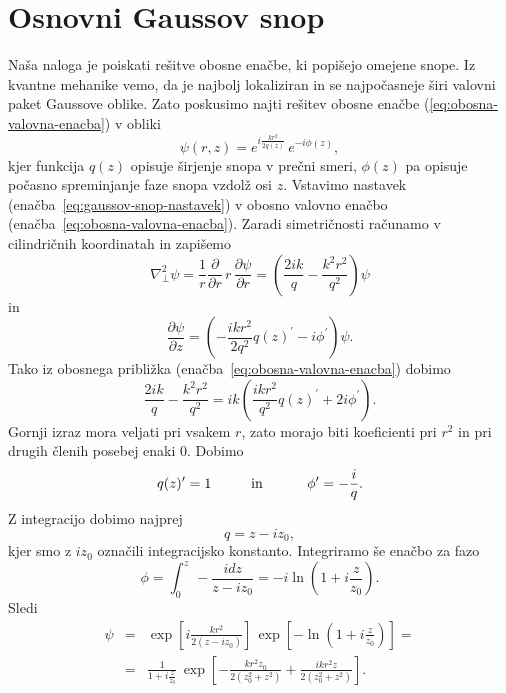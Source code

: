 \section{Osnovni Gaussov snop}
Naša naloga je poiskati rešitve obosne enačbe, ki popišejo omejene
snope. Iz kvantne mehanike vemo, da je najbolj lokaliziran in se najpočasneje
širi valovni paket Gaussove oblike. Zato poskusimo najti rešitev obosne
enačbe (\ref{eq:obosna-valovna-enacba}) v obliki 
\begin{equation}
\psi(r,z)=e^{i\frac{kr^{2}}{2q(z)}}\, e^{-i\phi(z)},\label{eq:gaussov-snop-nastavek}
\end{equation}
kjer funkcija $q(z)$ opisuje širjenje snopa v prečni smeri,
$\phi(z)$ pa opisuje počasno spreminjanje faze snopa vzdolž osi $z$.
Vstavimo nastavek (enačba~\ref{eq:gaussov-snop-nastavek}) v obosno valovno enačbo 
(enačba~\ref{eq:obosna-valovna-enacba}).
Zaradi simetričnosti računamo v cilindričnih koordinatah in zapišemo
\begin{equation}
\nabla_{\perp}^{2}\psi=\frac{1}{r}\frac{\partial}{\partial r}\, r\,\frac{\partial\psi}{\partial r}=
\left( \frac{2ik}{q}-\frac{k^2r^2}{q^2}\right)\psi
\end{equation}
 in 
\begin{equation}
\frac{\partial\psi}{\partial z}=\left(-\frac{ikr^{2}}{2q^2}q(z)^{\prime}-i\phi^{\prime}\right)\psi.
\end{equation}
Tako iz obosnega približka (enačba~\ref{eq:obosna-valovna-enacba}) dobimo
\begin{equation}
\frac{2ik}{q}-\frac{k^2r^2}{q^2}=ik\left(\frac{ikr^{2}}{q^2}q(z)^{\prime}+2i\phi^{\prime}\right).
\end{equation}
Gornji izraz mora veljati pri vsakem $r$, zato morajo biti koeficienti
pri $r^{2}$ in pri drugih členih posebej enaki 0. Dobimo
\begin{equation}
q(z)^{\prime}=1\mbox{\hskip1cm in \hskip1cm}\phi^{\prime}=-\frac{i}{q}.
\end{equation}
 Z integracijo dobimo najprej 
\begin{equation}
q=z-iz_{0},
\label{eq:alpha}
\end{equation}
kjer smo z $i z_{0}$ označili integracijsko konstanto. 
Integriramo še enačbo za fazo 
\begin{equation}
\phi=\int_{0}^{z}\,-\frac{i dz}{z-iz_{0}}=-i\ln(1+i\frac{z}{z_{0}}).
\end{equation}
Sledi
\begin{eqnarray}
\psi & = & \exp\left[i\frac{kr^{2}}{2(z-iz_0)}\right]\,\exp\left[-\ln(1+i\frac{z}{z_{0}})\right]=
\nonumber \\
 & = & \frac{1}{1+i\frac{z}{z_{0}}}\,\exp\left[-\frac{kr^{2}z_{0}}{2(z_{0}^{2}+z^{2})}+
 \frac{ikr^{2}z}{2(z_{0}^{2}+z^{2})}\right].
 \label{eq:gaussov-snop-vmesni}
\end{eqnarray}
